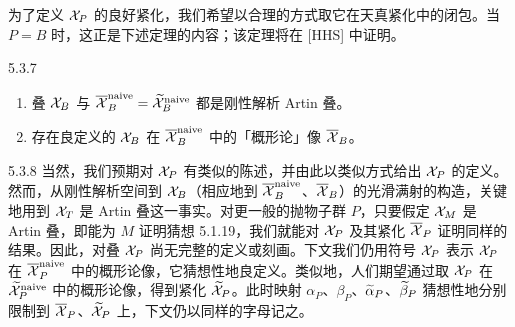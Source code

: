 为了定义 $\mathcal{X}_P$ 的良好紧化，我们希望以合理的方式取它在天真紧化中的闭包。当 $P=B$ 时，这正是下述定理的内容；该定理将在 [HHS] 中证明。

\begin{thm}{5.3.7}\label{thm:a4-5-3-7}
\begin{enumerate}[label=(\roman*),leftmargin=2.2em,itemsep=0.1em]
\item 叠 $\mathcal{X}_B$ 与 $\overline{\mathcal{X}}_B^{\mathrm{naive}}=\widetilde{\mathcal{X}}_B^{\mathrm{naive}}$ 都是刚性解析 Artin 叠。
\item 存在良定义的 $\mathcal{X}_B$ 在 $\overline{\mathcal{X}}_B^{\mathrm{naive}}$ 中的「概形论」像 $\overline{\mathcal{X}}_B$。
\end{enumerate}
\end{thm}

\begin{rem}{5.3.8}\label{rem:a4-5-3-8}
当然，我们预期对 $\mathcal{X}_P$ 有类似的陈述，并由此以类似方式给出 $\mathcal{X}_P$ 的定义。然而，从刚性解析空间到 $\mathcal{X}_B$（相应地到 $\overline{\mathcal{X}}_B^{\mathrm{naive}}$、$\overline{\mathcal{X}}_B$）的光滑满射的构造，关键地用到 $\mathcal{X}_T$ 是 Artin 叠这一事实。对更一般的抛物子群 $P$，只要假定 $\mathcal{X}_M$ 是 Artin 叠，即能为 $M$ 证明猜想 5.1.19，我们就能对 $\mathcal{X}_P$ 及其紧化 $\overline{\mathcal{X}}_P$ 证明同样的结果。因此，对叠 $\mathcal{X}_P$ 尚无完整的定义或刻画。下文我们仍用符号 $\mathcal{X}_P$ 表示 $\mathcal{X}_P$ 在 $\overline{\mathcal{X}}_P^{\mathrm{naive}}$ 中的概形论像，它猜想性地良定义。类似地，人们期望通过取 $\mathcal{X}_P$ 在 $\widetilde{\mathcal{X}}_P^{\mathrm{naive}}$ 中的概形论像，得到紧化 $\widetilde{\mathcal{X}}_P$。此时映射 $\alpha_P$、$\beta_P$、$\widetilde\alpha_P$、$\widetilde\beta_P$ 猜想性地分别限制到 $\overline{\mathcal{X}}_P$、$\widetilde{\mathcal{X}}_P$ 上，下文仍以同样的字母记之。
\end{rem}

